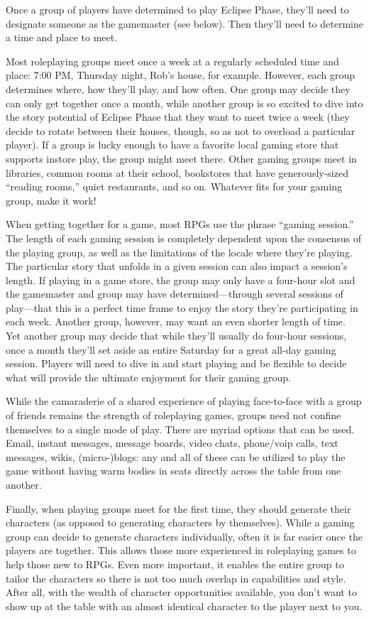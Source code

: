 Once a group of players have determined to play Eclipse Phase, they'll need to designate someone as the gamemaster (see below). Then they'll need to determine a time and place to meet. 

Most roleplaying groups meet once a week at a regularly scheduled time and place: 7:00 PM, Thursday night, Rob's house, for example. However, each group determines where, how they'll play, and how often. One group may decide they can only get together once a month, while another group is so excited to dive into the story potential of Eclipse Phase that they want to meet twice a week (they decide to rotate between their houses, though, so as not to overload a particular player). If a group is lucky enough to have a favorite local gaming store that supports instore play, the group might meet there. Other gaming groups meet in libraries, common rooms at their school, bookstores that have generously-sized ``reading rooms,'' quiet restaurants, and so on. Whatever fits for your gaming group, make it work! 

When getting together for a game, most RPGs use the phrase ``gaming session.'' The length of each gaming session is completely dependent upon the consensus of the playing group, as well as the limitations of the locale where they're playing. The particular story that unfolds in a given session can also impact a session's length. If playing in a game store, the group may only have a four-hour slot and the gamemaster and group may have determined—through several sessions of play—that this is a perfect time frame to enjoy the story they're participating in each week. Another group, however, may want an even shorter length of time. Yet another group may decide that while they'll usually do four-hour sessions, once a month they'll set aside an entire Saturday for a great all-day gaming session. Players will need to dive in and start playing and be flexible to decide what will provide the ultimate enjoyment for their gaming group. 

While the camaraderie of a shared experience of playing face-to-face with a group of friends remains the strength of roleplaying games, groups need not confine themselves to a single mode of play. There are myriad options that can be used. Email, instant messages, message boards, video chats, phone/voip calls, text messages, wikis, (micro-)blogs: any and all of these can be utilized to play the game without having warm bodies in seats directly across the table from one another. 

Finally, when playing groups meet for the first time, they should generate their characters (as opposed to generating characters by themselves). While a gaming group can decide to generate characters individually, often it is far easier once the players are together. This allows those more experienced in roleplaying games to help those new to RPGs. Even more important, it enables the entire group to tailor the characters so there is not too much overlap in capabilities and style. After all, with the wealth of character opportunities available, you don't want to show up at the table with an almost identical character to the player next to you. 

